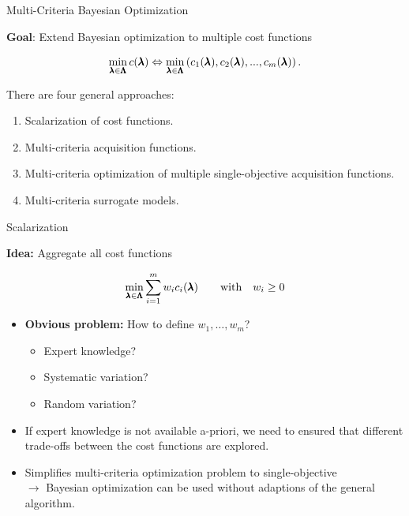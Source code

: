 \begin{frame}{Multi-Criteria Bayesian Optimization}

\textbf{Goal}: Extend Bayesian optimization to multiple cost functions

$$
\min_{\pmb{\lambda} \in \pmb{\Lambda}}  c(\pmb{\lambda}) \Leftrightarrow \min_{\pmb{\lambda} \in \pmb{\Lambda}} \left(c_1(\pmb{\lambda}), c_2(\pmb{\lambda}), ..., c_m(\pmb{\lambda})\right).
$$



There are four general approaches:

\begin{enumerate}
        \item Scalarization of cost functions.
        \item Multi-criteria acquisition functions.
        \item Multi-criteria optimization of multiple single-objective acquisition functions.
        \item Multi-criteria surrogate models.
\end{enumerate}

\end{frame}

\begin{frame}{Scalarization}

    \textbf{Idea:} Aggregate all cost functions


    $$\min_{\pmb{\lambda} \in \pmb{\Lambda}} \sum_{i = 1}^m w_i c_i(\pmb{\lambda}) \qquad \text{with} \quad w_i \ge 0 $$

    \begin{itemize}
        \item \textbf{Obvious problem:} How to define $w_1, \dots, w_m$?
            \begin{itemize}
                \item Expert knowledge?
                \item Systematic variation?
                \item Random variation?
            \end{itemize}
        \item If expert knowledge is not available a-priori, we need to ensured that different trade-offs between the cost functions are explored.
            \item Simplifies multi-criteria optimization problem to single-objective \\$\longrightarrow$ Bayesian optimization can be used without adaptions of the general algorithm.
    \end{itemize}

\end{frame}

